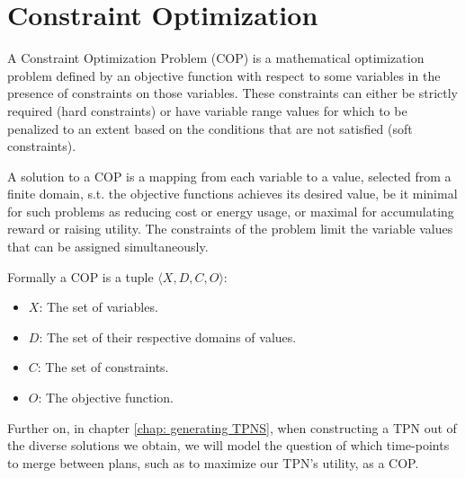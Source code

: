 \section{Constraint Optimization}
\label{background: COP}
A Constraint Optimization Problem (COP) is a mathematical optimization problem defined by an objective function with respect to some variables in the presence of constraints on those variables. 
These constraints can either be strictly required (hard constraints) or have variable range values for which to be penalized to an extent based on the conditions that are not satisfied (soft constraints).

A solution to a COP is a mapping from each variable to a value, selected from a finite domain, s.t. the objective functions achieves its desired value, be it minimal for such problems as reducing cost or energy usage, or maximal for accumulating reward or raising utility.
The constraints of the problem limit the variable values that can be assigned simultaneously.

Formally a COP is a tuple $\langle X,D,C,O\rangle$: 
\begin{itemize}
    \item $X$: The set of variables.  
    \item $D$: The set of their respective domains of values. 
    \item $C$: The set of constraints.
    \item $O$: The objective function.
\end{itemize}




Further on, in chapter \ref{chap: generating TPNS},  when constructing a TPN out of the diverse solutions we obtain, we will model the question of which time-points to merge between plans, such as to maximize our TPN's utility, as a COP.

